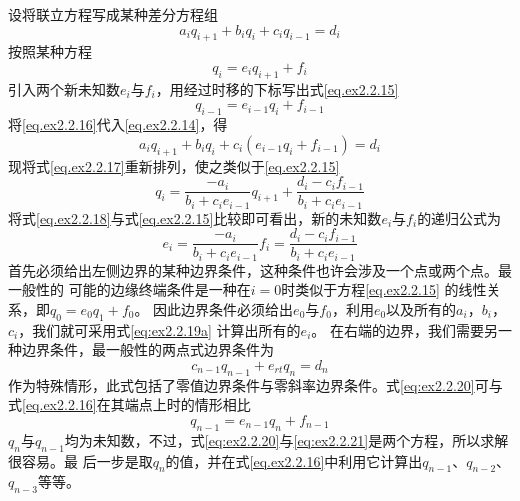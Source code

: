 设将联立方程写成某种差分方程组
\begin{equation}
a_iq_{i+1}+b_iq_i+c_iq_{i-1}=d_i
\label{eq.ex2.2.14}
\end{equation}
按照某种方程
\begin{equation}
q_i=e_iq_{i+1}+f_i
\label{eq.ex2.2.15}
\end{equation}
引入两个新未知数$e_i$与$f_i$，用经过时移的下标写出式\ref{eq.ex2.2.15}
\begin{equation}
q_{i-1}=e_{i-1}q_{i}+f_{i-1}
\label{eq.ex2.2.16}
\end{equation}
将\ref{eq.ex2.2.16}代入\ref{eq.ex2.2.14}，得
\begin{equation}
a_iq_{i+1}+b_iq_i+c_i(e_{i-1}q_{i}+f_{i-1})=d_i
\label{eq.ex2.2.17}
\end{equation}
现将式\ref{eq.ex2.2.17}重新排列，使之类似于\ref{eq.ex2.2.15}
\begin{equation}
q_i=\frac{-a_i}{b_i+c_ie_{i-1}}q_{i+1}+\frac{d_i-c_if_{i-1}}{b_i+c_ie_{i-1}}
\label{eq.ex2.2.18}
\end{equation}
将式\ref{eq.ex2.2.18}与式\ref{eq.ex2.2.15}比较即可看出，新的未知数$e_i$与$f_i$的递归公式为
\begin{subequations}
\begin{equation}
e_i=\frac{-a_i}{b_i+c_ie_{i-1}}
\label{eq:ex2.2.19a}
\end{equation}
\begin{equation}
f_i=\frac{d_i-c_if_{i-1}}{b_i+c_ie_{i-1}}
\label{eq:ex2.2.19b}
\end{equation}
\label{eq:ex2.2.19}
\end{subequations}
首先必须给出左侧边界的某种边界条件，这种条件也许会涉及一个点或两个点。最一般性的
可能的边缘终端条件是一种在$i=0$时类似于方程\ref{eq.ex2.2.15}
的线性关系，即$q_0=e_0q_1+f_0$。
因此边界条件必须给出$e_0$与$f_0$，利用$e_0$以及所有的$a_i$，$b_i$，$c_i$，我们就可采用式\ref{eq:ex2.2.19a}
计算出所有的$e_i$。
在右端的边界，我们需要另一种边界条件，最一般性的两点式边界条件为
\begin{equation}
c_{n-1}q_{n-1}+e_{rt}q_n=d_n
\label{eq:ex2.2.20}
\end{equation}
作为特殊情形，此式包括了零值边界条件与零斜率边界条件。式\ref{eq:ex2.2.20}可与式\ref{eq.ex2.2.16}在其端点上时的情形相比
\begin{equation}
q_{n-1}=e_{n-1}q_n+f_{n-1}
\label{eq:ex2.2.21}
\end{equation}
$q_n$与$q_{n-1}$均为未知数，不过，式\ref{eq:ex2.2.20}与\ref{eq:ex2.2.21}是两个方程，所以求解很容易。最
后一步是取$q_n$的值，并在式\ref{eq.ex2.2.16}中利用它计算出$q_{n-1}$、$q_{n-2}$、$q_{n-3}$等等。

